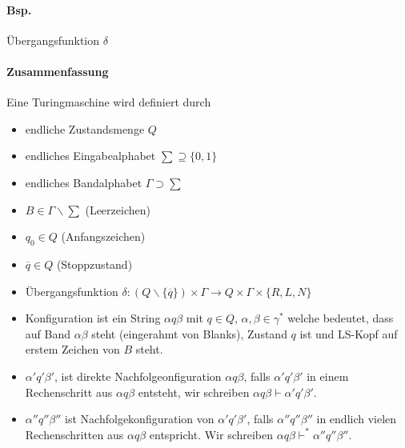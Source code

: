 
\paragraph*{Bsp.} Übergangsfunktion $\delta$ %

\paragraph*{Zusammenfassung} Eine Turingmaschine wird definiert durch
\begin{itemize}
	\item endliche Zustandsmenge $Q$
	\item endliches Eingabealphabet $\sum \supseteq \{ 0,1 \}$
	\item endliches Bandalphabet $\Gamma \supset \sum$
	\item $B \in \Gamma\backslash\sum$ (Leerzeichen)
	\item $q_0 \in Q$ (Anfangszeichen)
	\item $\overline{q} \in Q$ (Stoppzustand)
	\item Übergangsfunktion $\delta : (Q \backslash \{ \overline{q} \}) \times \Gamma \rightarrow Q \times \Gamma \times \{ R,L,N \}$
\end{itemize}

\begin{itemize}
	\item Konfiguration ist ein String $\alpha q \beta$ mit $q \in Q$, $\alpha,\beta \in \gamma^*$ welche bedeutet, dass auf Band $\alpha\beta$ steht (eingerahmt von Blanks), Zustand $q$ ist und LS-Kopf auf erstem Zeichen von $B$ steht.
	\item $\alpha'q'\beta'$, ist direkte Nachfolgeonfiguration $\alpha q \beta$, falls $\alpha'q'\beta'$ in einem Rechenschritt aus $\alpha q \beta$ entsteht, wir schreiben $\alpha q \beta \vdash \alpha'q'\beta'$.
	\item $\alpha''q''\beta''$ ist Nachfolgekonfiguration von $\alpha'q'\beta'$, falls $\alpha''q''\beta''$ in endlich vielen Rechenschritten aus $\alpha q \beta$ entspricht. Wir schreiben $\alpha q \beta \vdash^* \alpha''q''\beta''$.
\end{itemize}

